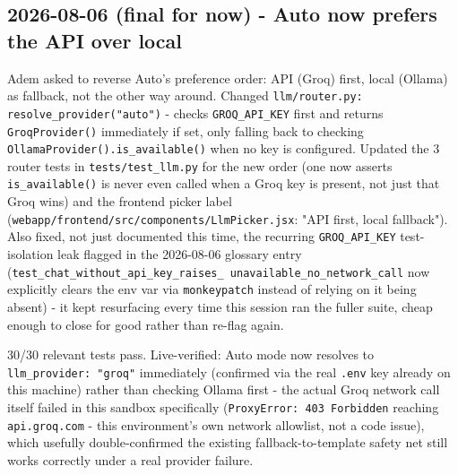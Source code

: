 \subsection*{2026-08-06 (final for now) - Auto now prefers the API over local}
Adem asked to reverse Auto's preference order: API (Groq) first, local (Ollama) as fallback, not the other way around. Changed \texttt{llm/\allowbreak{}router.py: resolve\_\allowbreak{}provider("auto")} - checks \texttt{GROQ\_\allowbreak{}API\_\allowbreak{}KEY} first and returns \texttt{GroqProvider()} immediately if set, only falling back to checking \texttt{OllamaProvider().is\_\allowbreak{}available()} when no key is configured. Updated the 3 router tests in \texttt{tests/\allowbreak{}test\_\allowbreak{}llm.py} for the new order (one now asserts \texttt{is\_\allowbreak{}available()} is never even called when a Groq key is present, not just that Groq wins) and the frontend picker label (\texttt{webapp/\allowbreak{}frontend/\allowbreak{}src/\allowbreak{}components/\allowbreak{}LlmPicker.jsx}: "API first, local fallback"). Also fixed, not just documented this time, the recurring \texttt{GROQ\_\allowbreak{}API\_\allowbreak{}KEY} test-isolation leak flagged in the 2026-08-06 glossary entry (\texttt{test\_\allowbreak{}chat\_\allowbreak{}without\_\allowbreak{}api\_\allowbreak{}key\_\allowbreak{}raises\_\allowbreak{} unavailable\_\allowbreak{}no\_\allowbreak{}network\_\allowbreak{}call} now explicitly clears the env var via \texttt{monkeypatch} instead of relying on it being absent) - it kept resurfacing every time this session ran the fuller suite, cheap enough to close for good rather than re-flag again.

30/30 relevant tests pass. Live-verified: Auto mode now resolves to \texttt{llm\_\allowbreak{}provider: "groq"} immediately (confirmed via the real \texttt{.env} key already on this machine) rather than checking Ollama first - the actual Groq network call itself failed in this sandbox specifically (\texttt{ProxyError: 403 Forbidden} reaching \texttt{api.groq.com} - this environment's own network allowlist, not a code issue), which usefully double-confirmed the existing fallback-to-template safety net still works correctly under a real provider failure.

